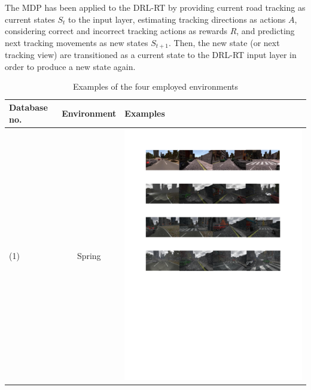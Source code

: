 \documentclass{svproc}
\begin{document}
The MDP has been applied to the DRL-RT by providing current road tracking as current states $S_t$ to the input layer, estimating tracking directions as actions $A$, considering correct and incorrect tracking actions as rewards $R$, and predicting next tracking movements as new states $S_{t+1}$. Then, the new state (or next tracking view) are transitioned as a current state to the DRL-RT input layer in order to produce a new state again.
\begin{table}[!t]
	\centering
	\caption{Examples of the four employed environments}
	\label{Table:Environments_Examples}
	\begin{tabular}{|C{1.5cm}|c|C{8.5cm}|}
		\hline
		\textbf{Database no.} & \textbf{Environment} & \textbf{Examples} \\ \hline
		(1)	& Spring & \begin{minipage}{.9\textwidth}\includegraphics[scale=.5,trim=2cm 24.5cm 2cm 2.5cm,clip]{examples.pdf}\end{minipage} \\ \hline

\end{tabular}
\end{table}
\end{document}
